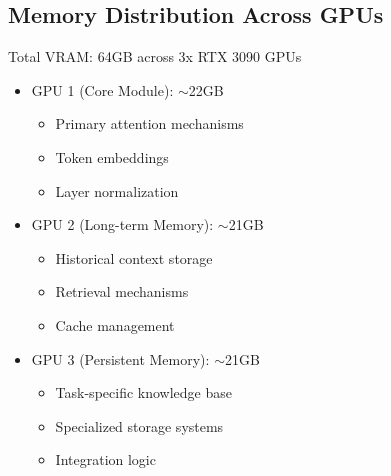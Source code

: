 \documentclass{article}
\begin{document}
\subsection{Memory Distribution Across GPUs}
Total VRAM: 64GB across 3x RTX 3090 GPUs
\begin{itemize}
    \item GPU 1 (Core Module): $\sim$22GB
    \begin{itemize}
        \item Primary attention mechanisms
        \item Token embeddings
        \item Layer normalization
    \end{itemize}
    \item GPU 2 (Long-term Memory): $\sim$21GB
    \begin{itemize}
        \item Historical context storage
        \item Retrieval mechanisms
        \item Cache management
    \end{itemize}
    \item GPU 3 (Persistent Memory): $\sim$21GB
    \begin{itemize}
        \item Task-specific knowledge base
        \item Specialized storage systems
        \item Integration logic
    \end{itemize}
\end{itemize}
\end{document}
